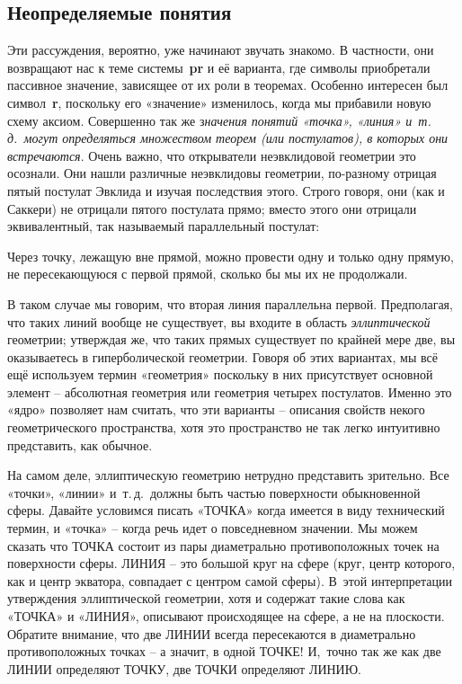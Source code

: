 \documentclass[../main.tex]{subfiles}
\begin{document}
\subsection{Неопределяемые понятия}

Эти рассуждения, вероятно, уже начинают звучать знакомо. В частности, они возвращают нас к теме системы~\textbf{pr} и её варианта, где символы приобретали пассивное значение, зависящее от их роли в теоремах. Особенно интересен был символ~\textbf{r}, поскольку его «значение» изменилось, когда мы прибавили новую схему аксиом. Совершенно так же з\emph{начения понятий «точка», «линия» и~т.\,д.\ могут определяться множеством теорем (или постулатов), в которых они встречаются}. Очень важно, что открыватели неэвклидовой геометрии это осознали. Они нашли различные неэвклидовы геометрии, по-разному отрицая пятый постулат Эвклида и изучая последствия этого. Строго говоря, они (как и Саккери) не отрицали пятого постулата прямо; вместо этого они отрицали эквивалентный, так называемый параллельный постулат:
%
\begin{block}
Через точку, лежащую вне прямой, можно провести одну и только одну прямую, не пересекающуюся с первой прямой, сколько бы мы их не продолжали.
\end{block}

В таком случае мы говорим, что вторая линия параллельна первой. Предполагая, что таких линий вообще не существует, вы входите в область \emph{эллиптической} геометрии; утверждая же, что таких прямых существует по крайней мере две, вы оказываетесь в гиперболической геометрии. Говоря об этих вариантах, мы всё ещё используем термин «геометрия» поскольку в них присутствует основной элемент \--- абсолютная геометрия или геометрия четырех постулатов. Именно это «ядро» позволяет нам считать, что эти варианты \--- описания свойств некого геометрического пространства, хотя это пространство не так легко интуитивно представить, как обычное.

На самом деле, эллиптическую геометрию нетрудно представить зрительно. Все «точки», «линии» и~т.\,д.\ должны быть частью поверхности обыкновенной сферы. Давайте условимся писать «ТОЧКА» когда имеется в виду технический термин, и «точка» \--- когда речь идет о повседневном значении. Мы можем сказать что ТОЧКА состоит из пары диаметрально противоположных точек на поверхности сферы. ЛИНИЯ \--- это большой круг на сфере (круг, центр которого, как и центр экватора, совпадает с центром самой сферы). В~этой интерпретации утверждения эллиптической геометрии, хотя и содержат такие слова как «ТОЧКА» и «ЛИНИЯ», описывают происходящее на сфере, а не на плоскости. Обратите внимание, что две ЛИНИИ всегда пересекаются в диаметрально противоположных точках \--- а значит, в одной ТОЧКЕ! И,~точно так же как две ЛИНИИ определяют ТОЧКУ, две ТОЧКИ определяют ЛИНИЮ\@.
\end{document}
